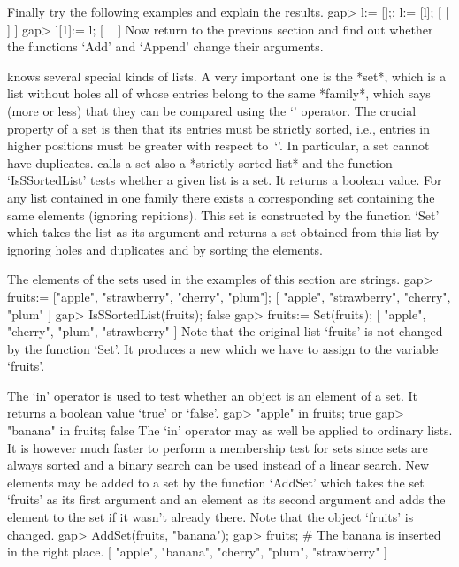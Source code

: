 Finally try the following examples and explain the results.
\beginexample
    gap> l:= [];; l:= [l];
    [ [  ] ]
    gap> l[1]:= l;
    [ ~ ]
\endexample
Now return to the  previous section and   find out whether the  functions
`Add' and `Append' change their arguments.


{\GAP} knows several special kinds of lists.  A very important one is the
*set*, which is a list without holes  all of whose  entries belong to the
same *family*,
%
which says (more  or less)  that they   can be  compared using  the  `\<'
operator. The crucial property of a set is then that  its entries must be
strictly sorted, i.e.,  entries in higher positions  must be greater with
respect  to~`\<'. In  particular,  a set  cannot have duplicates.  {\GAP}
calls a set also a *strictly sorted list*
%
and the function `IsSSortedList' tests whether a given  list is a set. It
returns  a boolean value.  For  any list  contained  in one family  there
exists a  corresponding   set containing  the  same   elements  (ignoring
repitions). This set is constructed by the function `Set' which takes the
list as   its argument and   returns a set  obtained  from this   list by
ignoring holes and duplicates and by sorting the elements.

The  elements  of  the  sets used  in  the  examples of this  section are
strings.
\beginexample
    gap> fruits:= ["apple", "strawberry", "cherry", "plum"];
    [ "apple", "strawberry", "cherry", "plum" ]
    gap> IsSSortedList(fruits);
    false
    gap> fruits:= Set(fruits);
    [ "apple", "cherry", "plum", "strawberry" ] 
\endexample
Note  that the  original list `fruits'  is not  changed  by the  function
`Set'.  It   produces a new  which  we  have to   assign to  the variable
`fruits'.

The `in' operator is  used  to test whether an  object is an element of a
set.  It returns a boolean value `true' or `false'.
\beginexample
    gap> "apple" in fruits;
    true
    gap> "banana" in fruits;
    false 
\endexample
The `in' operator may as well be applied to ordinary lists. It is however
much faster to perform  a membership test for sets  since sets are always
sorted and a binary  search can be used instead  of a linear search.  New
elements may be added to a  set by the function  `AddSet' which takes the
set `fruits' as its first argument and an  element as its second argument
and adds the element to the set if it wasn't already there. Note that the
object `fruits' is changed.
\beginexample
    gap> AddSet(fruits, "banana");
    gap> fruits;  #  The banana is inserted in the right place.
    [ "apple", "banana", "cherry", "plum", "strawberry" ]

